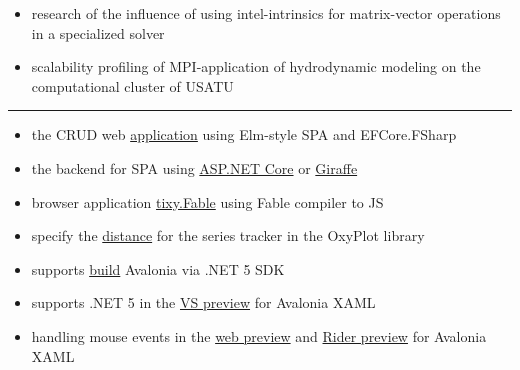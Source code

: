 \documentclass[10pt,a4paper,ragged2e,withhyper]{altacv}
\begin{document}
\begin{paracol}{2}
\begin{itemize}
  \item research of the influence of using  intel-intrinsics for matrix-vector
  \newline operations in a specialized solver
  \smallskip

  \item scalability profiling of MPI-application of hydrodynamic modeling
  \newline on the computational cluster of USATU

\end{itemize}

{\color{headingrule}\rule{\linewidth}{1pt}\par}\medskip


\smallskip

\begin{itemize}

  \item the CRUD web
  \href{https://github.com/rstm-sf/ClientServerCRUD}{application}
  using Elm-style SPA and EFCore.FSharp
  \smallskip

  \item the backend for SPA using
  \href{https://github.com/rstm-sf/ASP.NETCoreBackendFor-Angular-GettingStarted}{ASP.NET Core} or
  \href{https://github.com/rstm-sf/GiraffeBackendFor-Angular-GettingStarted}{Giraffe}
  \smallskip

  \item browser application
  \href{https://github.com/rstm-sf/tixy.Fable}{tixy.Fable}
  using Fable compiler to JS
  \smallskip

  \item specify the
  \href{https://github.com/oxyplot/oxyplot/pull/1736}{distance}
  for the series tracker in the OxyPlot library
  \smallskip

  \item supports
  \href{https://github.com/AvaloniaUI/Avalonia/pull/5415}{build}
  Avalonia via .NET 5 SDK
  \smallskip

  \item supports .NET 5 in the
  \href{https://github.com/AvaloniaUI/AvaloniaVS/pull/181}{VS preview}
  for Avalonia XAML
  \smallskip

  \item handling mouse events in the
  \href{https://github.com/AvaloniaUI/Avalonia/pull/4418}{web preview}
  and \href{https://github.com/ForNeVeR/AvaloniaRider/pull/82}{Rider preview}
  for \newline Avalonia XAML
  \smallskip


\end{itemize}
\end{paracol}
\end{document}
